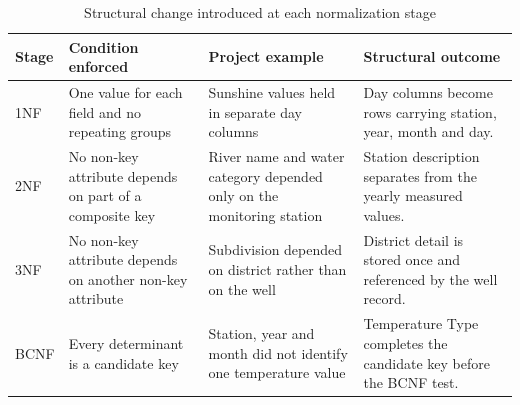 \begin{table}[H]
\centering
\caption{Structural change introduced at each normalization stage}
\label{tab:normalization-summary}
\begin{tabular}{L{0.10\textwidth}L{0.25\textwidth}L{0.24\textwidth}L{0.26\textwidth}}
\toprule
Stage & Condition enforced & Project example & Structural outcome \\
\midrule
1NF & One value for each field and no repeating groups &
Sunshine values held in separate day columns &
Day columns become rows carrying station, year, month and day. \\
2NF & No non-key attribute depends on part of a composite key &
River name and water category depended only on the monitoring station &
Station description separates from the yearly measured values. \\
3NF & No non-key attribute depends on another non-key attribute &
Subdivision depended on district rather than on the well &
District detail is stored once and referenced by the well record. \\
BCNF & Every determinant is a candidate key &
Station, year and month did not identify one temperature value &
Temperature Type completes the candidate key before the BCNF test. \\
\bottomrule
\end{tabular}
\end{table}

\setlength{\abovedisplayskip}{11pt plus 3pt minus 6pt}
\setlength{\belowdisplayskip}{11pt plus 3pt minus 6pt}
\setlength{\abovedisplayshortskip}{0pt plus 3pt}
\setlength{\belowdisplayshortskip}{6.5pt plus 3.5pt minus 3pt}
\clearpage

